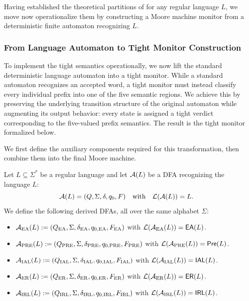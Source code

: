 Having established the theoretical partitions of for any regular language $L$, we move now operationalize them by constructing a Moore machine monitor from a deterministic finite automaton recognizing  $L$.

\subsubsection{From Language Automaton to Tight Monitor Construction}

To implement the tight semantics operationally, we now lift the standard deterministic language automaton into a tight monitor. While a standard automaton recognizes an accepted word, a tight monitor must instead classify every individual prefix into one of the five semantic regions. We achieve this by preserving the underlying transition structure of the original automaton while augmenting its output behavior: every state is assigned a tight verdict corresponding to the five-valued prefix semantics. The result is the tight monitor formalized below.



We first define the auxiliary components required for this transformation, then combine them into the final Moore machine.

\begin{definition}\label{def:five-aut}
Let $L\subseteq\Sigma^*$ be a regular language and let $\mathcal{A}(L)$ be a DFA recognizing the language $L$:
\[
  \mathcal{A}(L)=(Q,\Sigma,\delta,q_0,F)
  \quad\text{with}\quad \mathcal{L}\!\left(\mathcal{A}(L)\right)=L.
\]
 We define the following derived DFAs, all over the same alphabet $\Sigma$:
\begin{itemize}
  \item $\mathcal{A}_{\mathrm{EA}}(L)  := (Q_{\mathrm{EA}},\Sigma,\delta_{\mathrm{EA}},q_{0,\mathrm{EA}},F_{\mathrm{EA}})$
        with $\mathcal{L}\!\left(\mathcal{A}_{\mathrm{EA}}(L)\right)=\mathsf{EA}\!\left(L\right)$.
  \item $\mathcal{A}_{\mathrm{PRE}}(L) := (Q_{\mathrm{PRE}},\Sigma,\delta_{\mathrm{PRE}},q_{0,\mathrm{PRE}},F_{\mathrm{PRE}})$
        with $\mathcal{L}\!\left(\mathcal{A}_{\mathrm{PRE}}(L)\right)=\mathsf{Pre}\!\left(L\right)$.
  \item $\mathcal{A}_{\mathrm{IAL}}(L) := (Q_{\mathrm{IAL}},\Sigma,\delta_{\mathrm{IAL}},q_{0,\mathrm{IAL}},F_{\mathrm{IAL}})$
        with $\mathcal{L}\!\left(\mathcal{A}_{\mathrm{IAL}}(L)\right)=\operatorname{\mathsf{IAL}}\!\left(L\right)$.
  \item $\mathcal{A}_{\mathrm{ER}}(L)  := (Q_{\mathrm{ER}},\Sigma,\delta_{\mathrm{ER}},q_{0,\mathrm{ER}},F_{\mathrm{ER}})$
        with $\mathcal{L}\!\left(\mathcal{A}_{\mathrm{ER}}(L)\right)=\mathsf{ER}\!\left(L\right)$.
  \item $\mathcal{A}_{\mathrm{IRL}}(L) := (Q_{\mathrm{IRL}},\Sigma,\delta_{\mathrm{IRL}},q_{0,\mathrm{IRL}},F_{\mathrm{IRL}})$
        with $\mathcal{L}\!\left(\mathcal{A}_{\mathrm{IRL}}(L)\right)=\operatorname{\mathsf{IRL}}\!\left(L\right)$.
\end{itemize}
\end{definition}

